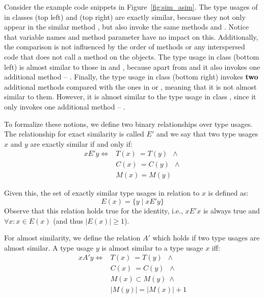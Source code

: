 Consider the example code snippets in Figure~\ref{fig:sim_asim}.
The type usages of  in classes  (top left) and  (top right) are exactly similar, because they not only appear in the similar method , but also invoke the same methods  and .
Notice that variable names and method parameter have no impact on this.
Additionally, the comparison is not influenced by the order of methods or any interspersed code that does not call a method on the  objects.
The type usage in class  (bottom left) is almost similar to those in  and , because apart from  and  it also invokes one additional method -- .
Finally, the type usage in class  (bottom right) invokes \textbf{two} additional methods compared with the ones in  or , meaning that it is not almost similar to them.
However, it is almost similar to the type usage in class , since it only invokes one additional method -- .

To formalize these notions, we define two binary relationships over type usages.
The relationship for exact similarity is called $E'$ and we say that two type usages $x$ and $y$ are exactly similar if and only if:
\begin{align*}
xE'y \iff & T(x) \: = T(y) \;\: \land \\
         & C(x) \: = C(y) \;\: \land \\
         & M(x) = M(y)
\end{align*}

Given this, the set of exactly similar type usages in relation to $x$ is defined as:
\begin{equation*}
E(x) = \{y \mid xE'y \}
\end{equation*}
Observe that this relation holds true for the identity, i.e., $xE'x$ is always true and $\forall x: x \in E(x)$ (and thus $|E(x)| \geq 1$).

For almost similarity, we define the relation $A'$ which holds if two type usages are almost similar.
A type usage $y$ is almost similar to a type usage $x$ iff:
\begin{align*}
xA'y \iff & T(x) \: = T(y) \;\; \land \\
         & C(x) \: = C(y) \;\; \land \\
         & M(x) \subset M(y) \: \land \\
         & |M(y)| = |M(x)| + 1
\end{align*}

